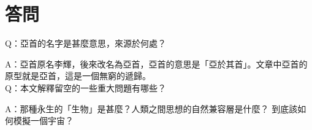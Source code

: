 \chapter{答問}



Q：亞首的名字是甚麼意思，來源於何處？

A：亞首原名李輝，後來改名為亞首，亞首的意思是「亞於其首」。文章中亞首的原型就是亞首，這是一個無窮的遞歸。
\\

Q：本文解釋留空的一些重大問題有哪些？

A：那種永生的「生物」是甚麼？人類之間思想的自然兼容層是什麼？ 到底該如何模擬一個宇宙？%

